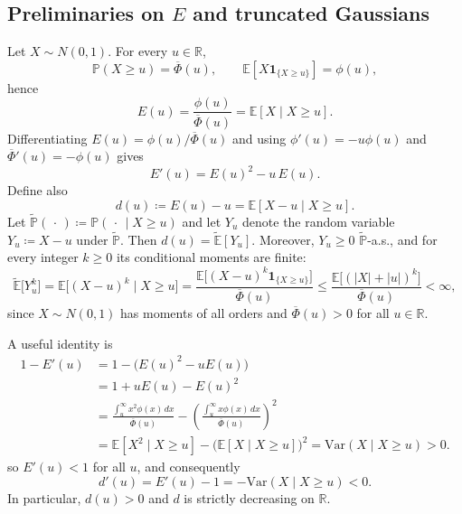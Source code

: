 \documentclass[11pt]{article}
\begin{document}
\subsection{Preliminaries on $E$ and truncated Gaussians}

Let $X\sim N(0,1)$. For every $u\in\mathbb{R}$,
\[
\mathbb{P}(X\ge u)=\overline{\Phi}(u),\qquad
\mathbb{E}[X\mathbf{1}_{\{X\ge u\}}]=\phi(u),
\]
hence
\begin{equation}\label{eq:condmean}
E(u)=\frac{\phi(u)}{\overline{\Phi}(u)}=\mathbb{E}[X\mid X\ge u].
\end{equation}
Differentiating $E(u)=\phi(u)/\overline{\Phi}(u)$ and using $\phi'(u)=-u\phi(u)$ and
$\overline{\Phi}'(u)=-\phi(u)$ gives
\begin{equation}\label{eq:mprime}
E'(u)=E(u)^2-u\,E(u).
\end{equation}
Define also
\[
d(u)\coloneqq E(u)-u=\mathbb{E}[X-u\mid X\ge u].
\]
Let $\tilde{\mathbb{P}}(\,\cdot\,)\coloneqq \mathbb{P}(\,\cdot\,\mid X\ge u)$ and let $Y_u$ denote the random variable
\(
Y_u\coloneqq X-u
\)
under $\tilde{\mathbb{P}}$. Then
\(
d(u)=\tilde{\mathbb{E}}[Y_u].
\) 
Moreover, $Y_u\ge 0$ $\tilde{\mathbb{P}}$-a.s., and for every integer $k\ge 0$ its conditional moments are finite:
\[
\tilde{\mathbb{E}}\bigl[Y_u^k\bigr]
=\mathbb{E}\bigl[(X-u)^k\mid X\ge u\bigr]
=\frac{\mathbb{E}\bigl[(X-u)^k\mathbf{1}_{\{X\ge u\}}\bigr]}{\overline{\Phi}(u)}
\le \frac{\mathbb{E}\bigl[(|X|+|u|)^k\bigr]}{\overline{\Phi}(u)}<\infty,
\]
since $X\sim N(0,1)$ has moments of all orders and $\overline{\Phi}(u)>0$ for all $u\in\mathbb{R}$.

A useful identity is
\begin{equation}\label{eq:varidentity}
\begin{aligned}
1-E'(u)
&=1-\bigl(E(u)^2-uE(u)\bigr)\\
&=1+uE(u)-E(u)^2\\
&=\frac{\int_u^\infty x^2\phi(x)\,dx}{\overline\Phi(u)}
-\left(\frac{\int_u^\infty x\phi(x)\,dx}{\overline\Phi(u)}\right)^2\\
&=\mathbb{E}[X^{2}\mid X\ge u]-\bigl(\mathbb{E}[X\mid X\ge u]\bigr)^{2}
=\mathrm{Var}(X\mid X\ge u)>0.
\end{aligned}
\end{equation}
so $E'(u)<1$ for all $u$, and consequently
\begin{equation}\label{eq:dprime}
d'(u)=E'(u)-1=-\mathrm{Var}(X\mid X\ge u)<0.
\end{equation}
In particular, $d(u)>0$ and $d$ is strictly decreasing on $\mathbb{R}$.
\end{document}
